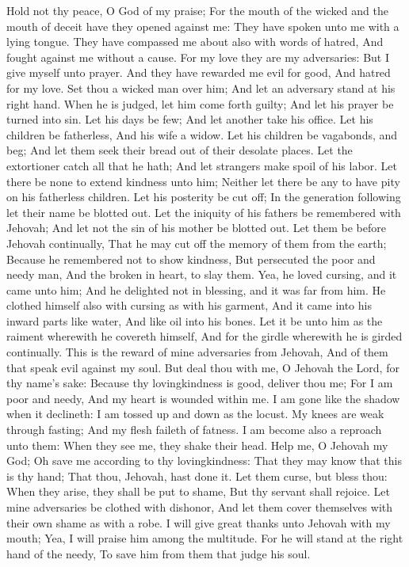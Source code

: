 Hold not thy peace, O God of my praise;  For the mouth of the wicked and the mouth of deceit have they opened against me: They have spoken unto me with a lying tongue.  They have compassed me about also with words of hatred, And fought against me without a cause.  For my love they are my adversaries: But I give myself unto prayer.  And they have rewarded me evil for good, And hatred for my love.  Set thou a wicked man over him; And let an adversary stand at his right hand.  When he is judged, let him come forth guilty; And let his prayer be turned into sin.  Let his days be few; And let another take his office.  Let his children be fatherless, And his wife a widow.  Let his children be vagabonds, and beg; And let them seek their bread out of their desolate places.  Let the extortioner catch all that he hath; And let strangers make spoil of his labor.  Let there be none to extend kindness unto him; Neither let there be any to have pity on his fatherless children.  Let his posterity be cut off; In the generation following let their name be blotted out.  Let the iniquity of his fathers be remembered with Jehovah; And let not the sin of his mother be blotted out.  Let them be before Jehovah continually, That he may cut off the memory of them from the earth;  Because he remembered not to show kindness, But persecuted the poor and needy man, And the broken in heart, to slay them.  Yea, he loved cursing, and it came unto him; And he delighted not in blessing, and it was far from him.  He clothed himself also with cursing as with his garment, And it came into his inward parts like water, And like oil into his bones.  Let it be unto him as the raiment wherewith he covereth himself, And for the girdle wherewith he is girded continually.  This is the reward of mine adversaries from Jehovah, And of them that speak evil against my soul.  But deal thou with me, O Jehovah the Lord, for thy name’s sake: Because thy lovingkindness is good, deliver thou me;  For I am poor and needy, And my heart is wounded within me.  I am gone like the shadow when it declineth: I am tossed up and down as the locust.  My knees are weak through fasting; And my flesh faileth of fatness.  I am become also a reproach unto them: When they see me, they shake their head.  Help me, O Jehovah my God; Oh save me according to thy lovingkindness:  That they may know that this is thy hand; That thou, Jehovah, hast done it.  Let them curse, but bless thou: When they arise, they shall be put to shame, But thy servant shall rejoice.  Let mine adversaries be clothed with dishonor, And let them cover themselves with their own shame as with a robe.  I will give great thanks unto Jehovah with my mouth; Yea, I will praise him among the multitude.  For he will stand at the right hand of the needy, To save him from them that judge his soul. 

